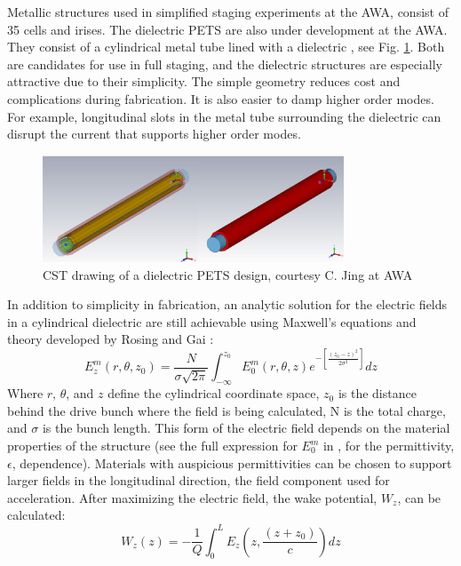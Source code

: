 Metallic structures used in simplified staging experiments at the AWA, consist of 35 cells and irises. 
The dielectric PETS are also under development at the AWA. 
They consist of a cylindrical metal tube lined with a dielectric \cite{PETSeq}, 
see Fig. \ref{fig:PETS}. Both are candidates for use in full staging, and 
the dielectric structures are especially attractive due to their simplicity. 
The simple geometry reduces cost and complications during fabrication.
It is also easier to damp higher order modes. For example, longitudinal slots in the metal tube surrounding
the dielectric can disrupt the current that supports higher order modes.   
\begin{figure}
	\begin{center}
		\includegraphics[width=0.8\textwidth]{images/pets-cst.png}
		\caption{CST drawing of a dielectric PETS design, courtesy C. Jing at AWA}
		\label{fig:PETS}
	\end{center}
\end{figure}
In addition to simplicity in fabrication, an analytic solution for the electric fields
in a cylindrical dielectric are still achievable using Maxwell's equations and theory developed
by Rosing and Gai \cite{RosingWei}:
\begin{equation}
E^m_z\left(r,\theta,z_0\right)= \frac{N}{\sigma \sqrt{2\pi}}\int_{-\infty}^{z_0}E^m_0\left(r,\theta,z\right)e^{-\left[\frac{\left(z_0-z\right)^2}{2\sigma^2}\right]}dz
\end{equation}
Where $r$, $\theta$, and $z$ define the cylindrical coordinate space, 
$z_0$ is the distance behind the drive bunch where the field is being calculated, 
N is the total charge, and $\sigma$ is the bunch length.
This form of the electric field depends on the material properties of the structure
(see the full expression for $E_0^m$ in \cite{RosingWei}, for the permittivity, $\epsilon$, dependence). 
Materials with auspicious permittivities can be chosen to support larger fields
in the longitudinal direction, the field component 
used for acceleration.   
After maximizing the electric field, the wake potential, $W_z$, can be calculated: 
\begin{equation}
W_z\left(z\right)= -\frac{1}{Q} \int_{0}^{L} E_z \left(z,\frac{\left(z+z_0\right)}{c}\right)dz
\label{eq:wakepotential}
\end{equation} 

